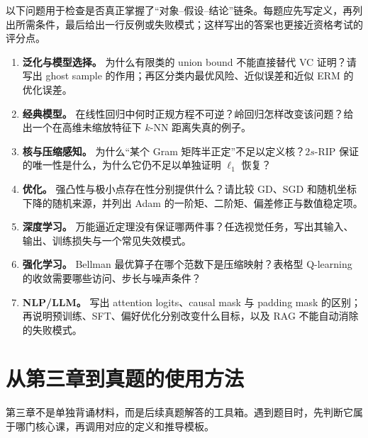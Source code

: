 \documentclass[11pt]{ctexart}
\begin{document}
以下问题用于检查是否真正掌握了“对象--假设--结论”链条。每题应先写定义，再列出所需条件，最后给出一行反例或失败模式；这样写出的答案也更接近资格考试的评分点。

\begin{enumerate}
  \item \textbf{泛化与模型选择。} 为什么有限类的 union bound 不能直接替代 VC 证明？请写出 ghost sample 的作用；再区分类内最优风险、近似误差和近似 ERM 的优化误差。
  \item \textbf{经典模型。} 在线性回归中何时正规方程不可逆？岭回归怎样改变该问题？给出一个在高维未缩放特征下 \(k\)-NN 距离失真的例子。
  \item \textbf{核与压缩感知。} 为什么“某个 Gram 矩阵半正定”不足以定义核？\(2s\)-RIP 保证的唯一性是什么，为什么它仍不足以单独证明 \(\ell_1\) 恢复？
  \item \textbf{优化。} 强凸性与极小点存在性分别提供什么？请比较 GD、SGD 和随机坐标下降的随机来源，并列出 Adam 的一阶矩、二阶矩、偏差修正与数值稳定项。
  \item \textbf{深度学习。} 万能逼近定理没有保证哪两件事？任选视觉任务，写出其输入、输出、训练损失与一个常见失效模式。
  \item \textbf{强化学习。} Bellman 最优算子在哪个范数下是压缩映射？表格型 Q-learning 的收敛需要哪些访问、步长与噪声条件？
  \item \textbf{NLP/LLM。} 写出 attention logits、causal mask 与 padding mask 的区别；再说明预训练、SFT、偏好优化分别改变什么目标，以及 RAG 不能自动消除的失败模式。
\end{enumerate}

\section{从第三章到真题的使用方法}

第三章不是单独背诵材料，而是后续真题解答的工具箱。遇到题目时，先判断它属于哪门核心课，再调用对应的定义和推导模板。
\end{document}
